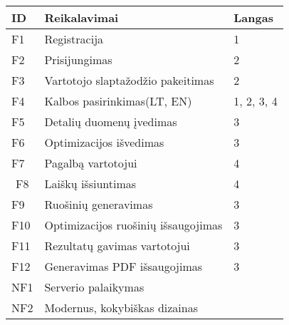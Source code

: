 \documentclass[a4paper,12pt]{article}
\begin{document}
\begin{frame}
\centering

\label{my-label}
\begin{tabular}{|l|l|l|}
\hline
\textbf{ID}              & \textbf{Reikalavimai}               & \textbf{Langas} \\ \hline
F1                       & Registracija                        & 1               \\ \hline
F2                       & Prisijungimas                       & 2               \\ \hline
F3                       & Vartotojo slaptažodžio pakeitimas   & 2               \\ \hline
F4                       & Kalbos pasirinkimas(LT, EN)         & 1, 2, 3, 4      \\ \hline
F5                       & Detalių duomenų įvedimas            & 3               \\ \hline
F6                       & Optimizacijos išvedimas             & 3               \\ \hline
F7                       & Pagalbą vartotojui                  & 4               \\ \hline
\multicolumn{1}{|c|}{F8} & Laiškų išsiuntimas                  & 4               \\ \hline
F9                       & Ruošinių generavimas                & 3               \\ \hline
F10                      & Optimizacijos ruošinių išsaugojimas & 3               \\ \hline
F11                      & Rezultatų gavimas vartotojui        & 3               \\ \hline
F12                      & Generavimas PDF išsaugojimas        & 3               \\ \hline
NF1                      & Serverio palaikymas                 &                 \\ \hline
NF2                      & Modernus, kokybiškas dizainas       &                 \\ \hline
\end{tabular}
\end{frame}
\end{document}
